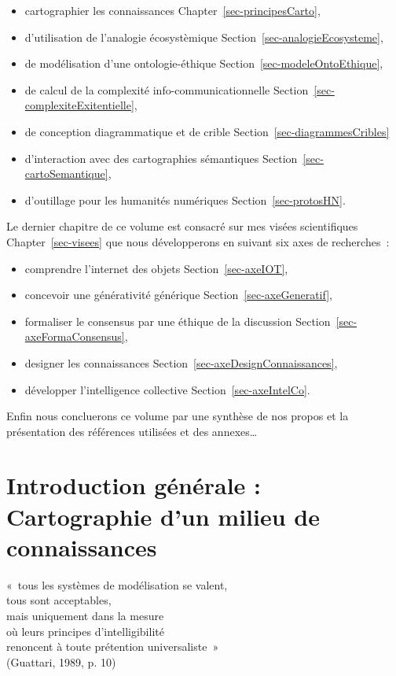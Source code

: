 \documentclass[
  a4paper,
  DIV=11,
  numbers=noendperiod]{scrreprt}
\providecommand{\tightlist}{%
  \setlength{\itemsep}{0pt}\setlength{\parskip}{0pt}}\usepackage{longtable,booktabs,array}
\begin{document}
\begin{itemize}
\tightlist
\item
  cartographier les connaissances Chapter~\ref{sec-principesCarto},
\item
  d'utilisation de l'analogie écosystèmique
  Section~\ref{sec-analogieEcosysteme},
\item
  de modélisation d'une ontologie-éthique
  Section~\ref{sec-modeleOntoEthique},
\item
  de calcul de la complexité info-communicationnelle
  Section~\ref{sec-complexiteExitentielle},
\item
  de conception diagrammatique et de crible
  Section~\ref{sec-diagrammesCribles}
\item
  d'interaction avec des cartographies sémantiques
  Section~\ref{sec-cartoSemantique},
\item
  d'outillage pour les humanités numériques Section~\ref{sec-protosHN}.
\end{itemize}

Le dernier chapitre de ce volume est consacré sur mes visées
scientifiques Chapter~\ref{sec-visees} que nous développerons en suivant
six axes de recherches~:

\begin{itemize}
\tightlist
\item
  comprendre l'internet des objets Section~\ref{sec-axeIOT},
\item
  concevoir une générativité générique Section~\ref{sec-axeGeneratif},
\item
  formaliser le consensus par une éthique de la discussion
  Section~\ref{sec-axeFormaConsensus},
\item
  designer les connaissances Section~\ref{sec-axeDesignConnaissances},
\item
  développer l'intelligence collective Section~\ref{sec-axeIntelCo}.
\end{itemize}

Enfin nous concluerons ce volume par une synthèse de nos propos et la
présentation des références utilisées et des annexes\ldots{}

\part{Introduction générale : Cartographie d'un milieu de connaissances}

\label{exergue1}
«~tous les systèmes de modélisation se valent,\\
tous sont acceptables,\\
mais uniquement dans la mesure\\
où leurs principes d'intelligibilité\\
renoncent à toute prétention universaliste~»\\
(Guattari, 1989, p. 10)
\end{document}
